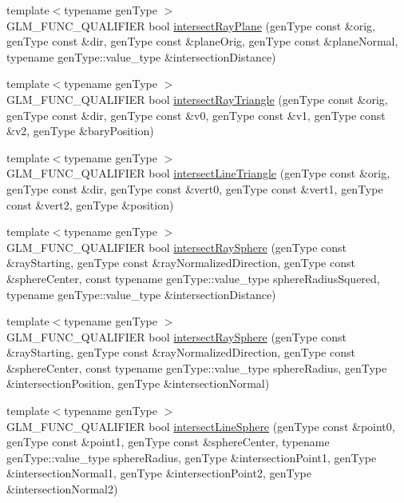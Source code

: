 \begin{DoxyCompactItemize}
\item 
{\footnotesize template$<$typename gen\+Type $>$ }\\G\+L\+M\+\_\+\+F\+U\+N\+C\+\_\+\+Q\+U\+A\+L\+I\+F\+I\+ER bool \hyperlink{group__gtx__intersect_gad3697a9700ea379739a667ea02573488}{intersect\+Ray\+Plane} (gen\+Type const \&orig, gen\+Type const \&dir, gen\+Type const \&plane\+Orig, gen\+Type const \&plane\+Normal, typename gen\+Type\+::value\+\_\+type \&intersection\+Distance)
\item 
{\footnotesize template$<$typename gen\+Type $>$ }\\G\+L\+M\+\_\+\+F\+U\+N\+C\+\_\+\+Q\+U\+A\+L\+I\+F\+I\+ER bool \hyperlink{group__gtx__intersect_gab16c1b47c10451e7604b51b39a7ef21d}{intersect\+Ray\+Triangle} (gen\+Type const \&orig, gen\+Type const \&dir, gen\+Type const \&v0, gen\+Type const \&v1, gen\+Type const \&v2, gen\+Type \&bary\+Position)
\item 
{\footnotesize template$<$typename gen\+Type $>$ }\\G\+L\+M\+\_\+\+F\+U\+N\+C\+\_\+\+Q\+U\+A\+L\+I\+F\+I\+ER bool \hyperlink{group__gtx__intersect_ga9d29b9b3acb504d43986502f42740df4}{intersect\+Line\+Triangle} (gen\+Type const \&orig, gen\+Type const \&dir, gen\+Type const \&vert0, gen\+Type const \&vert1, gen\+Type const \&vert2, gen\+Type \&position)
\item 
{\footnotesize template$<$typename gen\+Type $>$ }\\G\+L\+M\+\_\+\+F\+U\+N\+C\+\_\+\+Q\+U\+A\+L\+I\+F\+I\+ER bool \hyperlink{group__gtx__intersect_gac88f8cd84c4bcb5b947d56acbbcfa56e}{intersect\+Ray\+Sphere} (gen\+Type const \&ray\+Starting, gen\+Type const \&ray\+Normalized\+Direction, gen\+Type const \&sphere\+Center, const typename gen\+Type\+::value\+\_\+type sphere\+Radius\+Squered, typename gen\+Type\+::value\+\_\+type \&intersection\+Distance)
\item 
{\footnotesize template$<$typename gen\+Type $>$ }\\G\+L\+M\+\_\+\+F\+U\+N\+C\+\_\+\+Q\+U\+A\+L\+I\+F\+I\+ER bool \hyperlink{group__gtx__intersect_gad28c00515b823b579c608aafa1100c1d}{intersect\+Ray\+Sphere} (gen\+Type const \&ray\+Starting, gen\+Type const \&ray\+Normalized\+Direction, gen\+Type const \&sphere\+Center, const typename gen\+Type\+::value\+\_\+type sphere\+Radius, gen\+Type \&intersection\+Position, gen\+Type \&intersection\+Normal)
\item 
{\footnotesize template$<$typename gen\+Type $>$ }\\G\+L\+M\+\_\+\+F\+U\+N\+C\+\_\+\+Q\+U\+A\+L\+I\+F\+I\+ER bool \hyperlink{group__gtx__intersect_ga9c68139f3d8a4f3d7fe45f9dbc0de5b7}{intersect\+Line\+Sphere} (gen\+Type const \&point0, gen\+Type const \&point1, gen\+Type const \&sphere\+Center, typename gen\+Type\+::value\+\_\+type sphere\+Radius, gen\+Type \&intersection\+Point1, gen\+Type \&intersection\+Normal1, gen\+Type \&intersection\+Point2, gen\+Type \&intersection\+Normal2)

\end{DoxyCompactItemize}
